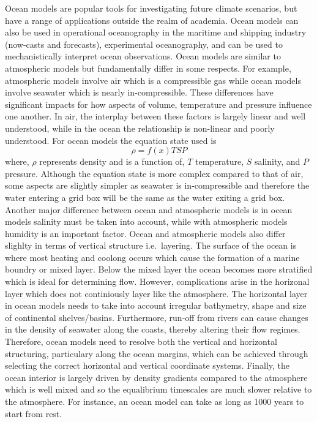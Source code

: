 \documentclass[
]{article}
\begin{document}
Ocean models are popular tools for investigating future climate
scenarios, but have a range of applications outside the realm of
academia. Ocean models can also be used in operational oceanography in
the maritime and shipping industry (now-casts and forecasts),
experimental oceanography, and can be used to mechanistically interpret
ocean observations. Ocean models are similar to atmospheric models but
fundamentally differ in some respects. For example, atmospheric models
involve air which is a compressible gas while ocean models involve
seawater which is nearly in-compressible. These differences have
significant impacts for how aspects of volume, temperature and pressure
influence one another. In air, the interplay between these factors is
largely linear and well understood, while in the ocean the relationship
is non-linear and poorly understood. For ocean models the equation state
used is \[\rho = f(x)TSP\] where, \(\rho\) represents density and is a
function of, \(T\) temperature, \(S\) salinity, and \(P\) pressure.
Although the equation state is more complex compared to that of air,
some aspects are slightly simpler as seawater is in-compressible and
therefore the water entering a grid box will be the same as the water
exiting a grid box. Another major difference between ocean and
atmospheric models is in ocean models salinity must be taken into
account, while with atmospheric models humidity is an important factor.
Ocean and atmospheric models also differ slighlty in terms of vertical
structure i.e.~layering. The surface of the ocean is where most heating
and coolong occurs which cause the formation of a marine boundry or
mixed layer. Below the mixed layer the ocean becomes more stratified
which is ideal for determining flow. However, complications arise in the
horizonal layer which does not continiously layer like the atmosphere.
The horizontal layer in ocean models needs to take into account
irregular bathymetry, shape and size of continental shelves/basins.
Furthermore, run-off from rivers can cause changes in the density of
seawater along the coasts, thereby altering their flow regimes.
Therefore, ocean models need to resolve both the vertical and horizontal
structuring, particulary along the ocean margins, which can be achieved
through selecting the correct horizontal and vertical coordinate
systems. Finally, the ocean interior is largely driven by density
gradients compared to the atmosphere which is well mixed and so the
equalibrium timescales are much slower relative to the atmosphere. For
instance, an ocean model can take as long as 1000 years to start from
rest.
\end{document}
